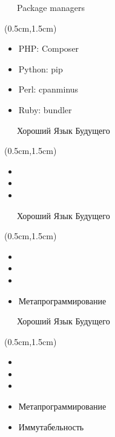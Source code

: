 \documentclass[xetex,18pt,aspectratio=43]{beamer}
\begin{document}
\begin{Large}
\begin{frame}{\ \ \ Package managers}
\begin{textblock*}{\framewidth-0.8cm}(0.5cm,1.5cm)
\begin{itemize}
  \item PHP: Composer
  \item Python: pip
  \item Perl: cpanminus
  \item Ruby: bundler
\end{itemize}
\end{textblock*}
\end{frame}

\begin{frame}{\ \ \ Хороший Язык Будущего}
\begin{textblock*}{\framewidth-0.8cm}(0.5cm,1.5cm)
\begin{itemize}
  \item {\color{gray}{Строгая типизация (PHP и JS - плохие)}}
  \item {\color{gray}{(Опциональная) статическая типизация}}
  \item {\color{gray}{Package/vendoring manager}}
\end{itemize}
\end{textblock*}
\end{frame}

\begin{frame}{\ \ \ Хороший Язык Будущего}
\begin{textblock*}{\framewidth-0.8cm}(0.5cm,1.5cm)
\begin{itemize}
  \item {\color{gray}{Строгая типизация (PHP и JS - плохие)}}
  \item {\color{gray}{(Опциональная) статическая типизация}}
  \item {\color{gray}{Package/vendoring manager}}
  \item Метапрограммирование
\end{itemize}
\end{textblock*}
\end{frame}

\begin{frame}{\ \ \ Хороший Язык Будущего}
\begin{textblock*}{\framewidth-0.8cm}(0.5cm,1.5cm)
\begin{itemize}
  \item {\color{gray}{Строгая типизация (PHP и JS - плохие)}}
  \item {\color{gray}{(Опциональная) статическая типизация}}
  \item {\color{gray}{Package/vendoring manager}}
  \item Метапрограммирование
  \item Иммутабельность
\end{itemize}
\end{textblock*}
\end{frame}


\end{Large}
\end{document}
